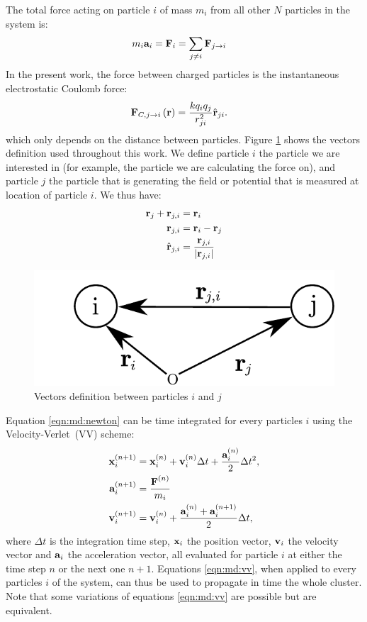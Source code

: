 The total force acting on particle $i$ of mass $m_i$ from all other $N$
particles in the system is:
\begin{align}
m_i \textbf{a}_i & = \textbf{F}_i = \sum_{j \ne i} \textbf{F}_{j \rightarrow i}
\label{eqn:md:newton}
\end{align}
In the present work, the force between charged particles is the instantaneous
electrostatic Coulomb force:
\begin{align}
\textbf{F}_{C,j \rightarrow i}\left( \textbf{r} \right) & =\frac{k q_i q_j}{r_{ji}^2} \hat{\textbf{r}}_{ji}.
\label{eqn:md:coulomb:F}
\end{align}
which only depends on the distance between particles. Figure
\ref{fig:md:vectors} shows the vectors definition used throughout this work. We
define particle $i$ the particle we are interested in (for example, the
particle we are calculating the force on), and particle $j$ the particle that
is generating the field or potential that is measured at location of particle
$i$. We thus have:
\begin{align}
\textbf{r}_{j} + \textbf{r}_{j,i} & = \textbf{r}_{i} \\
\textbf{r}_{j,i} & = \textbf{r}_{i} - \textbf{r}_{j} \\
\hat{\textbf{r}}_{j,i} & = \frac{\textbf{r}_{j,i}}{\left| \textbf{r}_{j,i} \right|}
\end{align}
%
\begin{figure}
 \centering
 \includegraphics[width=0.5\columnwidth]{figures/vectors}
 \caption{\label{fig:md:vectors}Vectors definition between particles $i$ and $j$}
\end{figure}
%
%
Equation \eqref{eqn:md:newton} can be time integrated for every particles
$i$ using the Velocity-Verlet~(VV) scheme:
\begin{subequations}
\label{eqn:md:vv}
\begin{align}
\textbf{x}_{i}^{\left( n+1 \right)} & = \textbf{x}_{i}^{\left( n \right)} + \textbf{v}_{i}^{\left( n \right)} \Delta t +
\frac{\textbf{a}_{i}^{\left( n \right)}}{2} \Delta t^2, \\
\textbf{a}_{i}^{\left( n+1 \right)} & = \frac{\textbf{F}^{\left( n \right)}}{m_i} \label{eqn:md:vv:a} \\
\textbf{v}_{i}^{\left( n+1 \right)} & = \textbf{v}_{i}^{\left( n \right)} + \frac{\textbf{a}_{i}^{\left( n \right)} +
\textbf{a}_{i}^{\left( n+1 \right)}}{2} \Delta t,
\end{align}
\end{subequations}
where $\Delta t$ is the integration time step, $\textbf{x}_{i}$ the position vector,
$\textbf{v}_{i}$ the velocity vector and $\textbf{a}_{i}$ the acceleration vector, all evaluated
for particle $i$ at either the time step $n$ or the next one $n+1$.
Equations \eqref{eqn:md:vv}, when applied to every particles $i$ of the system,
can thus be used to propagate in time the whole cluster. Note that some
variations of equations \eqref{eqn:md:vv} are possible but are equivalent.

